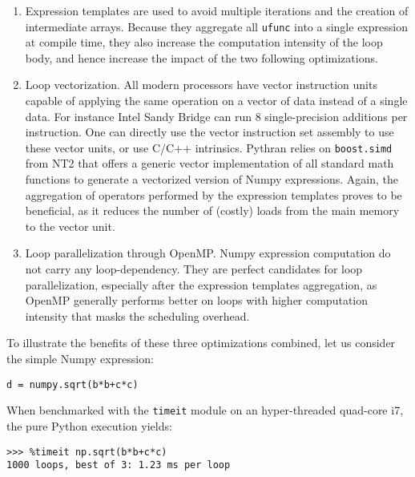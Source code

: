 \documentclass[10pt, onecolumn, preprint]{sigplanconf}
\begin{document}
\begin{enumerate}

    \item Expression templates\cite{expression_templates} are used to avoid
        multiple iterations and the creation of intermediate arrays. Because
        they aggregate all \texttt{ufunc} into a single expression at compile
        time, they also increase the computation intensity of the loop body,
        and hence increase the impact of the two following optimizations.

    \item Loop vectorization. All modern processors have vector instruction
        units capable of applying the same operation on a vector of data
        instead of a single data. For instance Intel Sandy Bridge can run 8
        single-precision additions per instruction. One can directly use the
        vector instruction set assembly to use these vector units, or use C/C++
        intrinsics. Pythran relies on \texttt{boost.simd} from NT2 that offers
        a generic vector implementation of all standard math functions to
        generate a vectorized version of Numpy expressions. Again, the
        aggregation of operators performed by the expression templates proves
        to be beneficial, as it reduces the number of (costly) loads from the
        main memory to the vector unit.

    \item Loop parallelization through OpenMP\cite{openmp3.1}. Numpy expression
        computation do not carry any loop-dependency. They are perfect
        candidates for loop parallelization, especially after the expression
        templates aggregation, as OpenMP generally performs better on loops
        with higher computation intensity that masks the scheduling overhead.

\end{enumerate}

To illustrate the benefits of these three optimizations combined, let us
consider the simple Numpy expression:

\begin{lstlisting}
d = numpy.sqrt(b*b+c*c)
\end{lstlisting}

When benchmarked with the \texttt{timeit} module on an hyper-threaded quad-core 
i7, the pure Python execution yields: %

\begin{lstlisting}
>>> %timeit np.sqrt(b*b+c*c)
1000 loops, best of 3: 1.23 ms per loop
\end{lstlisting}
\end{document}
